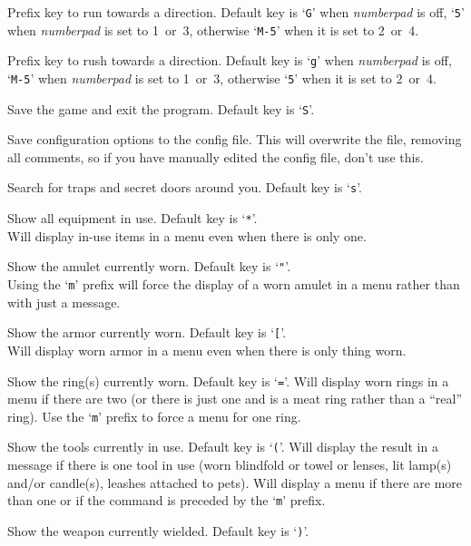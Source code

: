 \documentclass[titlepage]{article}
\begin{document}
\begin{description}[font=\mdseries\ttfamily]
Prefix key to run towards a direction.
Default key is `\texttt{G}' when
\textit{number\textunderscore pad}
is off,
`\texttt{5}' when
\textit{number\textunderscore pad}
is set to 1~or~3,
otherwise `\texttt{M-5}' when it is set to 2~or~4.
\item[\#rush]
Prefix key to rush towards a direction.
Default key is `\texttt{g}' when
\textit{number\textunderscore pad}
is off,
`\texttt{M-5}' when
\textit{number\textunderscore pad}
is set to 1~or~3,
otherwise `\texttt{5}' when it is set to 2~or~4.
\item[\#save]
Save the game and exit the program.
Default key is `\texttt{S}'.
\item[\#saveoptions]
Save configuration options to the config file.
This will overwrite the file, removing all comments, so if you have
manually edited the config file, don't use this.
\item[\#search]
Search for traps and secret doors around you. Default key is `\texttt{s}'.
\item[\#seeall]
Show all equipment in use. Default key is `\texttt{*}'.
\\
Will display in-use items in a menu even when there is only one.
\item[\#seeamulet]
Show the amulet currently worn. Default key is `\texttt{"}'.
\\
Using the `\texttt{m}' prefix will force the display of a worn
amulet in a menu rather than with just a message.
\item[\#seearmor]
Show the armor currently worn. Default key is `\texttt{[}'.
\\
Will display worn armor in a menu even when there is only thing worn.
\item[\#seerings]
Show the ring(s) currently worn. Default key is `\texttt{=}'.
Will display worn rings in a menu if there are two (or there is
just one and is a meat ring rather than a ``real'' ring).
Use the `\texttt{m}' prefix to force a menu for one ring.
\item[\#seetools]
Show the tools currently in use. Default key is `\texttt{(}'.
Will display the result in a message if there is one tool in use (worn
blindfold or towel or lenses, lit lamp(s) and/or candle(s), leashes
attached to pets).
Will display a menu if there are more than one or if the command is
preceded by the `\texttt{m}' prefix.
\item[\#seeweapon]
Show the weapon currently wielded. Default key is `\texttt{)}'.

\end{description}
\end{document}
